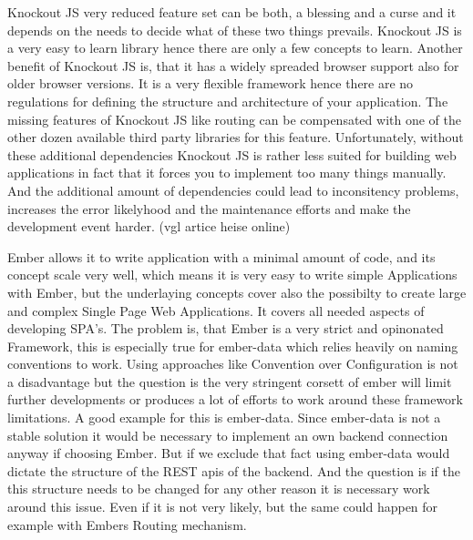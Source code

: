 Knockout JS very reduced feature set can be both, a blessing and a curse and it depends on the needs to decide what of these two things prevails. Knockout JS is a very easy to learn library hence there are only a few concepts to learn. Another benefit of Knockout JS is, that it has a widely spreaded browser support also for older browser versions. It is a very flexible framework hence there are  no regulations for defining the structure and architecture of your application. The missing features of Knockout JS like routing can be compensated with one of the other dozen available third party libraries for this feature. Unfortunately, without these additional dependencies Knockout JS is rather less suited for building web applications in fact that it forces you to implement too many things manually. And the additional amount of dependencies could lead to inconsitency problems, increases the error likelyhood and the maintenance efforts and make the development event harder. (vgl artice heise online)     


Ember allows it to write application with a minimal amount of code, and its concept scale very well, which means it is very easy to write simple Applications with Ember, but the underlaying concepts cover also the possibilty to create large and complex Single Page Web Applications. It covers all needed aspects of developing SPA's. The problem is, that Ember is a very strict and opinonated Framework, this is especially true for ember-data which relies heavily on naming conventions to work. Using approaches like Convention over Configuration is not a disadvantage but the question is the very stringent corsett of ember will limit further developments or produces a lot of efforts to work around these framework limitations. A good example for this is ember-data. Since ember-data is not a stable solution it would be necessary to implement an own backend connection anyway if choosing Ember. But if we exclude that fact using ember-data would dictate the structure of the REST apis of the backend. And the question is if the this structure needs to be changed for any other reason it is necessary work around this issue. Even if it is not very likely, but the same could happen for example with Embers Routing mechanism. 


